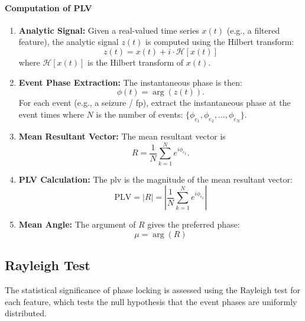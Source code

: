 \paragraph{Computation of PLV}
\begin{enumerate}
    \item \textbf{Analytic Signal:} Given a real-valued time series $x(t)$ (e.g., a filtered feature), the analytic signal $z(t)$ is computed using the Hilbert transform:
    \begin{equation} \label{eq:analytic-signal}
        z(t) = x(t) + i \cdot \mathcal{H}[x(t)]
    \end{equation}
    where $\mathcal{H}[x(t)]$ is the Hilbert transform of $x(t)$.

    \item \textbf{Event Phase Extraction:}
    The instantaneous phase is then:
    \begin{equation} \label{eq:instantaneous-phase}
        \phi(t) = \arg(z(t)).
    \end{equation}
    For each event (e.g., a seizure / \gls{fp}), extract the instantaneous phase at the event times where $N$ is the number of events: $\{\phi_{e_1}, \phi_{e_2}, \ldots, \phi_{e_N}\}$.

    \item \textbf{Mean Resultant Vector:} The mean resultant vector is
    \begin{equation} \label{eq:mean-resultant-vector}
        R = \frac{1}{N} \sum_{k=1}^N e^{i \phi_{e_k}}.
    \end{equation}

    \item \textbf{PLV Calculation:} The \gls{plv} is the magnitude of the mean resultant vector:
    \begin{equation} \label{eq:plv}
        \mathrm{PLV} = |R| = \left| \frac{1}{N} \sum_{k=1}^N e^{i \phi_{e_k}} \right|
    \end{equation}

    \item \textbf{Mean Angle:} The argument of $R$ gives the preferred phase:
    \begin{equation} \label{eq:plv-mean-angle}
        \mu = \arg(R)
    \end{equation}
\end{enumerate}

\subsection{Rayleigh Test} \label{subsec:rayleigh}
The statistical significance of phase locking is assessed using the Rayleigh test for each feature, which tests the null hypothesis that the event phases are uniformly distributed.

